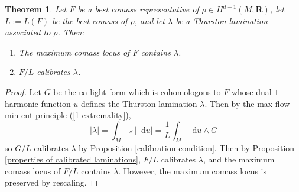 \documentclass[reqno,11pt]{amsart}
\newcommand{\RR}{\mathbf{R}}
\newcommand*\dif{\mathop{}\!\mathrm{d}}
\newtheorem{theorem}{Theorem}[section]
\theoremstyle{definition}
\numberwithin{equation}{section}
\begin{document}
\begin{theorem}\label{MCL contains Thurston}
Let $F$ be a best comass representative of $\rho \in H^{d - 1}(M, \RR)$, let $L := L(F)$ be the best comass of $\rho$, and let $\lambda$ be a Thurston lamination associated to $\rho$.
Then:
\begin{enumerate}
\item The maximum comass locus of $F$ contains $\lambda$.
\item $F/L$ calibrates $\lambda$.
\end{enumerate}
\end{theorem}
\begin{proof}
Let $G$ be the $\infty$-light form which is cohomologous to $F$ whose dual $1$-harmonic function $u$ defines the Thurston lamination $\lambda$.
Then by the max flow min cut principle (\ref{1 extremality}), 
$$|\lambda| = \int_M \star |\dif u| = \frac{1}{L} \int_M \dif u \wedge G$$
so $G/L$ calibrates $\lambda$ by Proposition \ref{calibration condition}.
Then by Proposition \ref{properties of calibrated laminations}, $F/L$ calibrates $\lambda$, and the maximum comass locus of $F/L$ contains $\lambda$.
However, the maximum comass locus is preserved by rescaling.
\end{proof}

\end{document}
